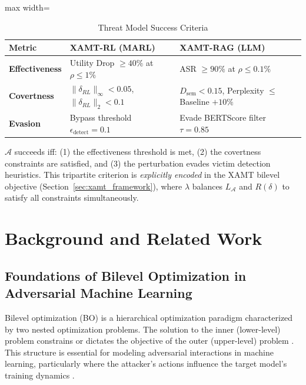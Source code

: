 \documentclass[conference]{IEEEtran}
\begin{document}
\begin{table}[!t]
\centering
\caption{Threat Model Success Criteria}
\label{tab:threat_model_metrics}
\footnotesize
\setlength{\tabcolsep}{3pt} %
\renewcommand{\arraystretch}{1.15} %

\begin{adjustbox}{max width=\columnwidth}
\begin{tabularx}{\columnwidth}{|p{}|X|X|}
\hline
\textbf{Metric} & \textbf{XAMT-RL (MARL)} & \textbf{XAMT-RAG (LLM)} \\
\hline
\textbf{Effectiveness} &
Utility Drop $\ge 40\%$ at $\rho \le 1\%$ &
ASR $\ge 90\%$ at $\rho \le 0.1\%$ \\
\hline
\textbf{Covertness} &
$\|\delta_{RL}\|_{\infty} < 0.05$, $\|\delta_{RL}\|_2 < 0.1$ &
$D_{\text{sem}} < 0.15$, Perplexity $\le$ Baseline $+10\%$ \\
\hline
\textbf{Evasion} &
Bypass threshold $\epsilon_{\text{detect}} = 0.1$ &
Evade BERTScore filter $\tau = 0.85$ \\
\hline
\end{tabularx}
\end{adjustbox}
\end{table}


$\mathcal{A}$ succeeds iff: (1) the effectiveness threshold is met, (2) the covertness constraints are satisfied, and (3) the perturbation evades victim detection heuristics. This tripartite criterion is \textit{explicitly encoded} in the XAMT bilevel objective (Section~\ref{sec:xamt_framework}), where $\lambda$ balances $L_{\mathcal{A}}$ and $R(\delta)$ to satisfy all constraints simultaneously.


\section{Background and Related Work}

\subsection{Foundations of Bilevel Optimization in Adversarial Machine Learning}
Bilevel optimization (BO) is a hierarchical optimization paradigm characterized by two nested optimization problems. The solution to the inner (lower-level) problem constrains or dictates the objective of the outer (upper-level) problem \cite{Ref21}. This structure is essential for modeling adversarial interactions in machine learning, particularly where the attacker's actions influence the target model's training dynamics \cite{Ref23}.
\end{document}
